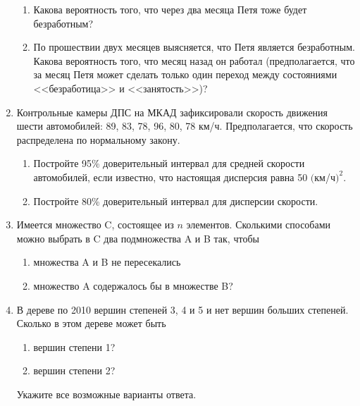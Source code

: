 \documentclass[pdftex,12pt,a4paper]{article}
\begin{document}
\begin{enumerate}
\begin{enumerate}
\item Какова вероятность того, что через два месяца Петя тоже будет безработным?
\item По прошествии двух месяцев выясняется, что Петя является безработным. Какова вероятность того, что месяц назад он работал (предполагается, что за месяц Петя может сделать только один переход между состояниями <<безработица>> и <<занятость>>)?
\end{enumerate}
\item Контрольные камеры ДПС на МКАД зафиксировали скорость движения шести автомобилей: 89, 83, 78, 96, 80, 78 км/ч. Предполагается, что скорость распределена по нормальному закону.
\begin{enumerate}
\item Постройте 95\% доверительный интервал для средней скорости автомобилей, если известно, что настоящая дисперсия равна 50 $($км/ч$)^2$.
\item Постройте 80\% доверительный интервал для дисперсии скорости.
\end{enumerate} 
\item Имеется множество C, состоящее из $n$ элементов. Сколькими способами можно выбрать в C два подмножества A и B так, чтобы
\begin{enumerate}
\item множества A и B не пересекались
\item множество A содержалось бы в множестве B?
\end{enumerate}
\item В дереве по 2010 вершин степеней 3, 4 и 5 и нет вершин больших степеней. Сколько в этом дереве может быть
\begin{enumerate}
\item вершин степени 1?
\item вершин степени 2?
\end{enumerate}
Укажите все возможные варианты ответа.
\end{enumerate}
\end{document}
